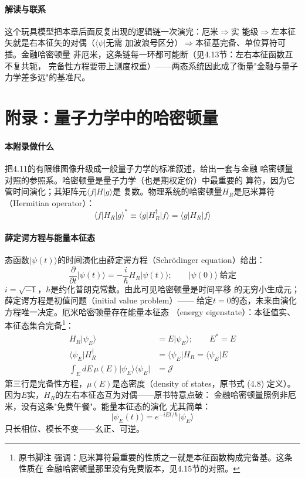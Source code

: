 \paragraph{解读与联系}
这个玩具模型把本章后面反复出现的逻辑链一次演完：厄米$\Rightarrow$实
能级$\Rightarrow$左本征矢就是右本征矢的对偶（$\langle\psi\vert$无需
加波浪号区分）$\Rightarrow$本征基完备、单位算符可插。金融哈密顿量
非厄米，这条链每一环都可能断（见4.13节：左右本征函数互不复共轭，
完备性方程要带上测度权重）——两态系统因此成了衡量"金融与量子
力学差多远"的基准尺。

\section{附录：量子力学中的哈密顿量}

\paragraph{本附录做什么}
把4.11的有限维图像升级成一般量子力学的标准叙述，给出一套与金融
哈密顿量对照的参照系。哈密顿量是量子力学（也是期权定价）中最重要的
算符，因为它管时间演化；其矩阵元$\langle f\vert H\vert g\rangle$是
复数。物理系统的哈密顿量$H_R$是厄米算符（Hermitian operator）：
\begin{equation*}
\langle f\vert H_R\vert g\rangle^{*}\equiv\langle g\vert H_R^{\dagger}
\vert f\rangle=\langle g\vert H_R\vert f\rangle
\end{equation*}

\paragraph{薛定谔方程与能量本征态}
态函数$\vert\psi(t)\rangle$的时间演化由薛定谔方程（Schr\"odinger
equation）给出：
\begin{equation*}
\frac{\partial}{\partial t}\vert\psi(t)\rangle=-\frac{i}{\hbar}
H_R\vert\psi(t)\rangle;\qquad \vert\psi(0)\rangle\ \text{给定}
\end{equation*}
$i=\sqrt{-1}$，$\hbar$是约化普朗克常数。由此可见哈密顿量是时间平移
的无穷小生成元；薛定谔方程是初值问题（initial value problem）——
给定$t=0$的态，未来由演化方程唯一决定。厄米哈密顿量存在能量本征态
（energy eigenstate）：本征值实、本征态集合完备\footnote{原书脚注
强调：厄米算符最重要的性质之一就是本征函数构成完备基。这条性质在
金融哈密顿量那里没有免费版本，见4.15节的对照。}：
\begin{align*}
H_R\vert\psi_E\rangle&=E\vert\psi_E\rangle;\qquad E^{*}=E\\
\langle\psi_E\vert H_R^{\dagger}&=\langle\psi_E\vert H_R
=\langle\psi_E\vert E\\
\int_E dE\,\mu(E)\vert\psi_E\rangle\langle\psi_E\vert&=\mathcal{J}
\tag{4.59}
\end{align*}
第三行是完备性方程，$\mu(E)$是态密度（density of states，原书式
(4.8) 定义）。因为$E$实，$H_R$的左右本征态互为对偶——原书特意点破：
金融哈密顿量照例非厄米，没有这条"免费午餐"。能量本征态的演化
尤其简单：
\begin{equation*}
\vert\psi_E(t)\rangle=e^{-iEt/\hbar}\vert\psi_E\rangle
\end{equation*}
只长相位、模长不变——幺正、可逆。

